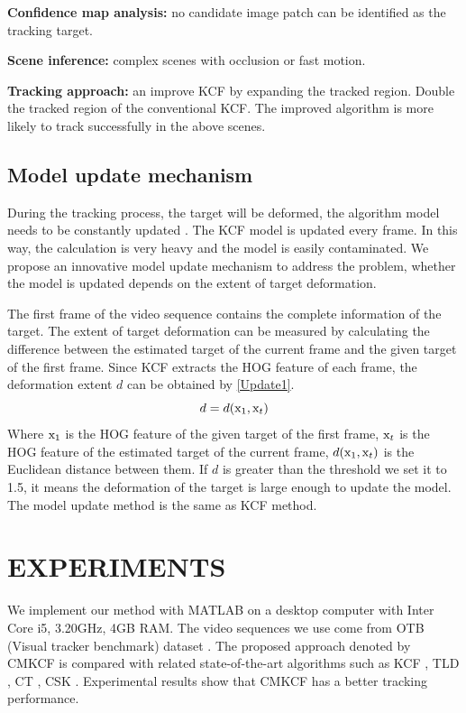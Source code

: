 \documentclass[conference]{IEEEtran}
\begin{document}
\noindent
{\bfseries Confidence map analysis:} no candidate image patch can be identified as the tracking target.

\noindent
{\bfseries Scene inference:} complex scenes with occlusion or fast motion.

\noindent
{\bfseries Tracking approach:} an improve KCF by expanding the tracked region.
Double the tracked region of the conventional KCF.
The improved algorithm is more likely to track successfully in the above scenes.


\subsection{Model update mechanism}
During the tracking process, the target will be deformed, the algorithm model needs to be constantly updated \cite{Modelupdate}.
The KCF model is updated every frame.
In this way, the calculation is very heavy and the model is easily contaminated.
We propose an innovative model update mechanism to address the problem, whether the model is updated depends on the extent of target deformation.

The first frame of the video sequence contains the complete information of the target.
The extent of target deformation can be measured by calculating the difference between the estimated target of the current frame and the given target of the first frame.
Since KCF extracts the HOG feature of each frame, the deformation extent $d$ can be obtained by \eqref{Update1}.
\begin{equation}
	d=d({\rm x}_1,{\rm x}_t)
	\label{Update1}
\end{equation}
Where ${\rm x}_1$ is the HOG feature of the given target of the first frame, ${\rm x}_t$ is the HOG feature of the estimated target of the current frame, $d({\rm x}_1,{\rm x}_t)$ is the Euclidean distance between them. 
If $d$ is greater than the threshold we set it to 1.5, it means the deformation of the target is large enough to update the model.
The model update method is the same as KCF method.

\section{EXPERIMENTS}

We implement our method with MATLAB on a desktop computer with Inter Core i5, 3.20GHz, 4GB RAM. 
The video sequences we use come from OTB (Visual tracker benchmark) dataset \cite{OTB}.
The proposed approach denoted by CMKCF is compared with related state-of-the-art algorithms such as KCF \cite{KCF}, TLD \cite{TLD}, CT \cite{CT}, CSK \cite{CSK}.
Experimental results show that CMKCF has a better tracking performance.
\end{document}

